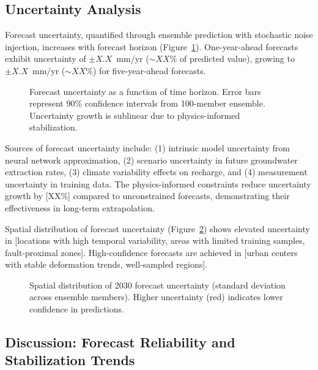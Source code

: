 \subsection{Uncertainty Analysis}

Forecast uncertainty, quantified through ensemble prediction with stochastic noise injection, increases with forecast horizon (Figure~\ref{fig:uncertainty}). One-year-ahead forecasts exhibit uncertainty of $\pm X.X$~mm/yr ($\sim XX$\% of predicted value), growing to $\pm X.X$~mm/yr ($\sim XX$\%) for five-year-ahead forecasts.

\begin{figure}[!t]
\centering
\caption{Forecast uncertainty as a function of time horizon. Error bars represent $90\%$ confidence intervals from 100-member ensemble. Uncertainty growth is sublinear due to physics-informed stabilization.}
\label{fig:uncertainty}
\end{figure}

Sources of forecast uncertainty include: (1) intrinsic model uncertainty from neural network approximation, (2) scenario uncertainty in future groundwater extraction rates, (3) climate variability effects on recharge, and (4) measurement uncertainty in training data. The physics-informed constraints reduce uncertainty growth by [XX\%] compared to unconstrained forecasts, demonstrating their effectiveness in long-term extrapolation.

Spatial distribution of forecast uncertainty (Figure~\ref{fig:uncertainty_map}) shows elevated uncertainty in [locations with high temporal variability, areas with limited training samples, fault-proximal zones]. High-confidence forecasts are achieved in [urban centers with stable deformation trends, well-sampled regions].

\begin{figure}[!t]
\centering
\caption{Spatial distribution of 2030 forecast uncertainty (standard deviation across ensemble members). Higher uncertainty (red) indicates lower confidence in predictions.}
\label{fig:uncertainty_map}
\end{figure}

\subsection{Discussion: Forecast Reliability and Stabilization Trends}

